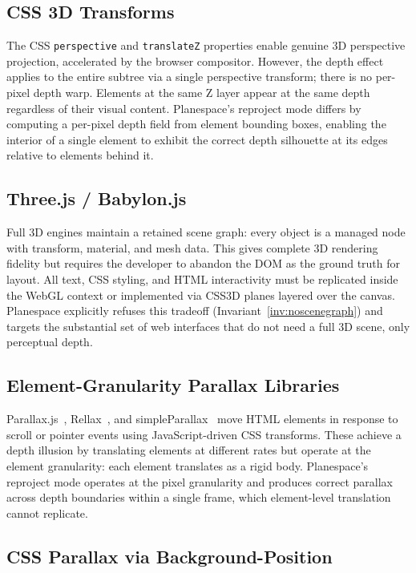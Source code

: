 \documentclass[10pt,twocolumn]{article}
\begin{document}
\subsection{CSS 3D Transforms}

The CSS \texttt{perspective} and \texttt{translateZ} properties enable genuine
3D perspective projection, accelerated by the browser compositor. However,
the depth effect applies to the entire subtree via a single perspective
transform; there is no per-pixel depth warp. Elements at the same Z layer
appear at the same depth regardless of their visual content. Planespace's
reproject mode differs by computing a per-pixel depth field from element
bounding boxes, enabling the interior of a single element to exhibit the
correct depth silhouette at its edges relative to elements behind it.

\subsection{Three.js / Babylon.js}

Full 3D engines maintain a retained scene graph: every object is a managed
node with transform, material, and mesh data. This gives complete 3D
rendering fidelity but requires the developer to abandon the DOM as the
ground truth for layout. All text, CSS styling, and HTML interactivity must
be replicated inside the WebGL context or implemented via CSS3D planes layered
over the canvas. Planespace explicitly refuses this tradeoff
(Invariant~\ref{inv:noscenegraph}) and targets the substantial set of web
interfaces that do not need a full 3D scene, only perceptual depth.

\subsection{Element-Granularity Parallax Libraries}

Parallax.js~\cite{wagerfield2014}, Rellax~\cite{mickpastor2022}, and
simpleParallax~\cite{georgemartineau2024} move HTML elements in response to
scroll or pointer events using JavaScript-driven CSS transforms. These achieve
a depth illusion by translating elements at different rates but operate at the
element granularity: each element translates as a rigid body. Planespace's
reproject mode operates at the pixel granularity and produces correct
parallax across depth boundaries within a single frame, which element-level
translation cannot replicate.

\subsection{CSS Parallax via Background-Position}
\end{document}
